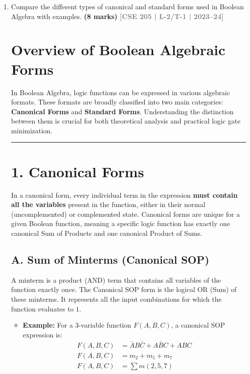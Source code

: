 \documentclass[12pt,a3paper]{article}
\newcommand{\yr}[1]{\hfill\textcolor{gray}{\small\textbf{[#1]}}}
\newcommand{\mk}[1]{\textcolor{orange!70!black}{\small\textbf{(#1 marks)}}}
\begin{document}
\begin{enumerate}

\item Compare the different types of canonical and standard forms used in Boolean Algebra with examples.
\mk{8} \yr{CSE 205 | L-2/T-1 | 2023--24}

\begin{tcolorbox}[enhanced,breakable,ansbox,colback=cB!4,colframe=cB,boxrule=0.8pt,arc=5pt,title={\textbf{Answer}},fonttitle=\bfseries\color{white},colbacktitle=cB]

\section*{Overview of Boolean Algebraic Forms}

In Boolean Algebra, logic functions can be expressed in various algebraic formats. These formats are broadly classified into two main categories: \textbf{\textcolor{cB}{Canonical Forms}} and \textbf{\textcolor{cB}{Standard Forms}}. Understanding the distinction between them is crucial for both theoretical analysis and practical logic gate minimization.

\vspace{0.2cm}
\hrule
\vspace{0.4cm}

\section*{1. Canonical Forms}

In a canonical form, every individual term in the expression \textbf{must contain all the variables} present in the function, either in their normal (uncomplemented) or complemented state. Canonical forms are unique for a given Boolean function, meaning a specific logic function has exactly one canonical Sum of Products and one canonical Product of Sums.

\subsection*{A. Sum of Minterms (Canonical SOP)}
A minterm is a product (AND) term that contains all variables of the function exactly once. The Canonical SOP form is the logical OR (Sum) of these minterms. It represents all the input combinations for which the function evaluates to $1$.
\begin{itemize}
    \item \textbf{Example:} For a 3-variable function $F(A, B, C)$, a canonical SOP expression is:
    \begin{align*}
        F(A, B, C) &= \bar{A}B\bar{C} + A\bar{B}C + ABC \\
        F(A, B, C) &= m_2 + m_5 + m_7 \\
        F(A, B, C) &= \sum m(2, 5, 7)
    \end{align*}
\end{itemize}


\end{tcolorbox}
\end{enumerate}
\end{document}
